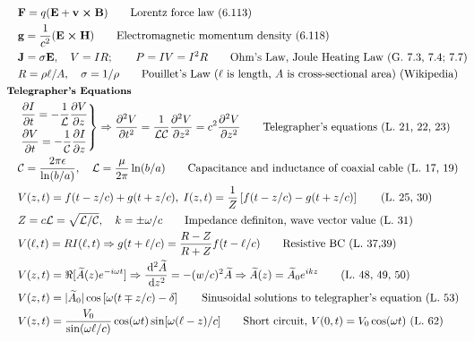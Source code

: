 \documentclass[10pt]{article}
\newcommand{\ve}[1]{\boldsymbol{\mathbf{#1}}}
\newcommand{\dd}{\, \mathrm{d}}
\newcommand{\pder}[2]{\frac{\partial #1}{\partial #2}}
\newcommand{\dtder}[2]{\frac{\dd^2 #1}{\dd #2^2}}
\newcommand{\dpder}[2]{\frac{\partial^2 #1}{\partial #2^2}}
\newcommand{\lrb}[1]{\left[ #1 \right]}
\begin{document}
\begin{multicols}{2}
\begin{align*}
		& \ve{F} = q(\ve{E} + \ve{v \times B}) \tag*{Lorentz force law (6.113)} \\
		& \ve{g} = \frac{1}{c^2} (\ve{E \times H}) \tag*{Electromagnetic momentum density (6.118)} \\
		& \ve{J} = \sigma \ve{E}, \quad V = IR; \qquad P = IV = I^2 R \tag*{Ohm's Law, Joule Heating Law (G. 7.3, 7.4; 7.7)} \\
		& R = \rho \ell / A, \quad \sigma = 1 / \rho	\tag*{Pouillet's Law ($\ell$ is length, $A$ is cross-sectional area) (Wikipedia)}\\
	& \small \hspace{-10pt} \textbf{Telegrapher's Equations} \small \\
		& \begin{drcases}
			\pder{I}{t} = -\frac{1}{\mathcal{L}} \pder{V}{z} \\
			\pder{V}{t} = - \frac{1}{\mathcal{C}} \pder{I}{z}\\
		\end{drcases} \Rightarrow \dpder{V}{t} = \frac{1}{\mathcal{LC}} \dpder{V}{z} = c^2 \dpder{V}{z} \tag*{Telegrapher's equations (L. 21, 22, 23)} \\
		& \mathcal{C} = \frac{2 \pi \epsilon}{\ln(b/a)}, \quad \mathcal{L} = \frac{\mu}{2 \pi} \ln(b/a) \tag*{Capacitance and inductance of coaxial cable (L. 17, 19)} \\
		& V(z,t) = f(t-z/c) + g(t+z/c), \; I(z,t) = \frac{1}{Z} \lrb{f(t-z/c) - g(t+z/c)} \tag*{(L. 25, 30)} \\
		& Z = c \mathcal{L} = \sqrt{\mathcal{L}/\mathcal{C}}, \quad k = \pm \omega/c \tag*{Impedance definiton, wave vector value (L. 31)} \\
		& V(\ell,t) = R I(\ell,t) \Rightarrow g(t+\ell/c) = \frac{R-Z}{R+Z} f(t-\ell/c) \tag*{Resistive BC (L. 37,39)}\\
		& V(z,t) = \Re[\widetilde{A}(z) e^{-i \omega t}] \Rightarrow \dtder{\widetilde{A}}{z} = -(w/c)^2 \widetilde{A} \Rightarrow \widetilde{A}(z) = \widetilde{A}_0 e^{ikz} \tag*{(L. 48, 49, 50)} \\
		& V(z,t) = |\widetilde{A}_0| \cos\lrb{\omega(t \mp z/c) -\delta} \tag*{Sinusoidal solutions to telegrapher's equation (L. 53)} \\
		& V(z,t) = \frac{V_0}{\sin(\omega \ell / c)} \cos (\omega t) \sin[\omega(\ell - z)/c] \tag*{Short circuit, $V(0,t) = V_0 \cos (\omega t)$ (L. 62)}\\	
 	\end{align*}
	\renewcommand{\arraystretch}{2}
	\begin{tabular}{| l | c | c |} \hline

\end{tabular}
\end{multicols}
\end{document}
